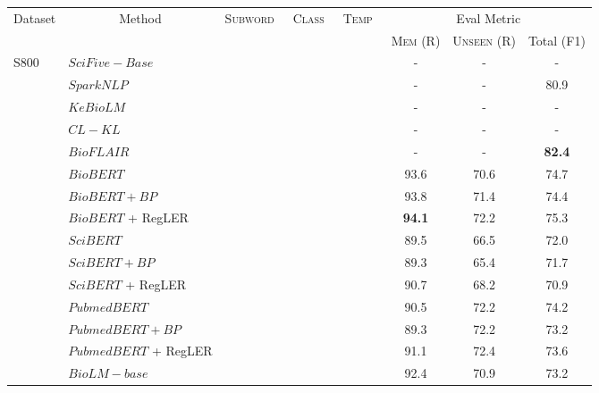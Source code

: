 \documentclass[11pt]{article}
\newcommand{\cmark}{\ding{51}}\newcommand{\xmark}{\ding{55}}\newcommand{\cross}{\ding{61}}\newcommand{\mb}[1]{\textcolor{red}{#1}}
\begin{document}
\begin{table*}[t]
\centering
\begin{adjustbox}{width=0.75\textwidth}
\begin{tabular}{ l l c c c c c c c }
\toprule
\multicolumn{1}{c}{\multirow{2}{*}{Dataset}} & \multicolumn{1}{c}{\multirow{2}{*}{Method}} & \multicolumn{1}{c}{\multirow{2}{*}{\textsc{Subword}~}} & \multicolumn{1}{c}{\multirow{2}{*}{\textsc{Class}~}} &
\multicolumn{1}{c}{\multirow{2}{*}{\textsc{Temp}~}} & \multicolumn{4}{c}{Eval Metric}       \\ \cmidrule{6-9} 
\multicolumn{1}{c}{} & & & & & 
\textsc{Mem} (R) & 
\textsc{Unseen} (R) & 
\multicolumn{2}{c}{Total (F1)} \\ \midrule
\multirow{21}{*}{S800}
& $SciFive-Base$ & \xmark & \xmark & \xmark & - & - & \multicolumn{2}{c}{-} \\
& $SparkNLP$ & \xmark & \xmark & \xmark & - & - & \multicolumn{2}{c}{80.9}  \\
& $KeBioLM$ & \xmark & \xmark & \xmark & - & - & \multicolumn{2}{c}{-} \\
& $CL - KL$ & \xmark & \xmark & \xmark & - & - & \multicolumn{2}{c}{-} \\
& $BioFLAIR$ & \xmark & \xmark & \xmark & - & - & \multicolumn{2}{c}{\textbf{82.4}} \\
\cmidrule{2-9}
& $BioBERT$ & \xmark & \xmark & \xmark & 93.6 & 70.6 & \multicolumn{2}{c}{74.7} \\
& $BioBERT + {BP}$ & \xmark & \xmark & \xmark & 93.8 & 71.4 & \multicolumn{2}{c}{74.4} \\
& $BioBERT$ + RegLER & \cmark & \cmark & \cmark & \textbf{94.1} & 72.2 & \multicolumn{2}{c}{75.3} \\
\cmidrule{2-9}
& $SciBERT$ & \xmark & \xmark & \xmark & 89.5 & 66.5 & \multicolumn{2}{c}{72.0} \\
& $SciBERT + {BP}$ & \xmark & \xmark & \xmark & 89.3 & 65.4 & \multicolumn{2}{c}{71.7} \\
& $SciBERT$ + RegLER & \cmark & \cmark & \cmark & 90.7 & 68.2 & \multicolumn{2}{c}{70.9} \\
\cmidrule{2-9}
& $PubmedBERT$ & \xmark & \xmark & \xmark & 90.5 & 72.2 & \multicolumn{2}{c}{74.2} \\
& $PubmedBERT + {BP}$ & \xmark & \xmark & \xmark & 89.3 & 72.2 & \multicolumn{2}{c}{73.2} \\
& $PubmedBERT$ + RegLER & \cmark & \cmark & \cmark & 91.1 & 72.4 & \multicolumn{2}{c}{73.6} \\
\cmidrule{2-9}
& $BioLM-base$ & \xmark & \xmark & \xmark & 92.4 & 70.9 &  \multicolumn{2}{c}{73.2} \\

\end{tabular}
\end{adjustbox}
\end{table*}
\end{document}
